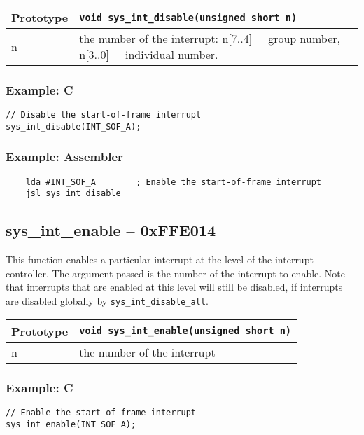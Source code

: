 \bigskip

\begin{tabular}{|l||l|} \hline
Prototype & \lstinline!void sys_int_disable(unsigned short n)! \\ \hline
n & the number of the interrupt: n[7..4] = group number, n[3..0] = individual number. \\ \hline
\end{tabular}

\subsubsection*{Example: C}
\begin{lstlisting}
// Disable the start-of-frame interrupt
sys_int_disable(INT_SOF_A);
\end{lstlisting}

\subsubsection*{Example: Assembler}
\begin{verbatim}
    lda #INT_SOF_A        ; Enable the start-of-frame interrupt
    jsl sys_int_disable
\end{verbatim}

\subsection*{sys\_int\_enable -- 0xFFE014}
This function enables a particular interrupt at the level of the interrupt controller.
The argument passed is the number of the interrupt to enable. Note that interrupts that are enabled at this level will still be disabled,
if interrupts are disabled globally by \verb+sys_int_disable_all+.

\bigskip

\begin{tabular}{|l||l|} \hline
Prototype & \lstinline!void sys_int_enable(unsigned short n)! \\ \hline
n & the number of the interrupt \\ \hline
\end{tabular}

\subsubsection*{Example: C}
\begin{lstlisting}
// Enable the start-of-frame interrupt
sys_int_enable(INT_SOF_A);
\end{lstlisting}


